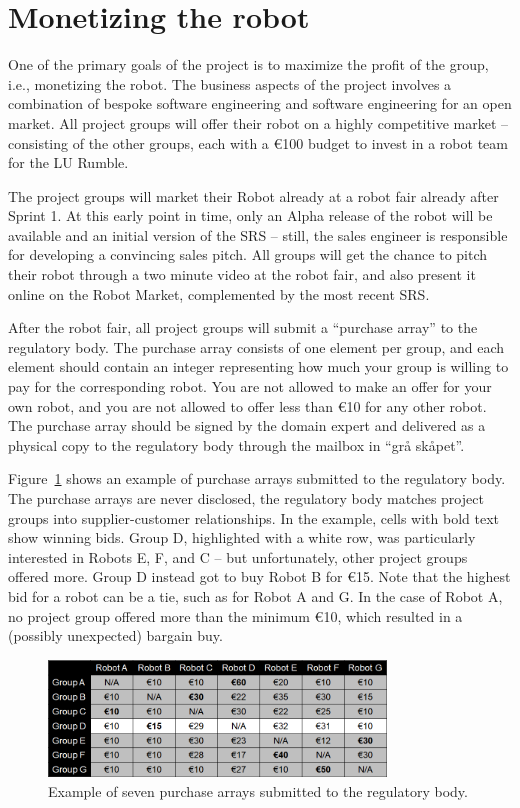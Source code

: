 \documentclass{scrreprt}
\begin{document}
\section{Monetizing the robot}
One of the primary goals of the project is to maximize the profit of the group, i.e., monetizing the robot. The business aspects of the project involves a combination of bespoke software engineering and software engineering for an open market. All project groups will offer their robot on a highly competitive market -- consisting of the other groups, each with a \euro 100 budget to invest in a robot team for the LU Rumble.

The project groups will market their Robot already at a robot fair already after Sprint 1. At this early point in time, only an Alpha release of the robot will be available and an initial version of the SRS -- still, the sales engineer is responsible for developing a convincing sales pitch. All groups will get the chance to pitch their robot through a two minute video at the robot fair, and also present it online on the Robot Market, complemented by the most recent SRS.

After the robot fair, all project groups will submit a ``purchase array'' to the regulatory body. The purchase array consists of one element per group, and each element should contain an integer representing how much your group is willing to pay for the corresponding robot. You are not allowed to make an offer for your own robot, and you are not allowed to offer less than \euro 10 for any other robot. The purchase array should be signed by the domain expert and delivered as a physical copy to the regulatory body through the mailbox in ``grå skåpet''.

Figure~\ref{fig:array} shows an example of purchase arrays submitted to the regulatory body. The purchase arrays are never disclosed, the regulatory body matches project groups into supplier-customer relationships. In the example, cells with bold text show winning bids. Group D, highlighted with a white row, was particularly interested in Robots E, F, and C -- but unfortunately, other project groups offered more. Group D instead got to buy Robot B for \euro 15. Note that the highest bid for a robot can be a tie, such as for Robot A and G. In the case of Robot A, no project group offered more than the minimum \euro 10, which resulted in a (possibly unexpected) bargain buy. 

\begin{figure}
\centering
\includegraphics[width=0.80\textwidth]{figures/purchaseArray.png}
\caption{Example of seven purchase arrays submitted to the regulatory body.}
\label{fig:array}
\end{figure}
\end{document}

